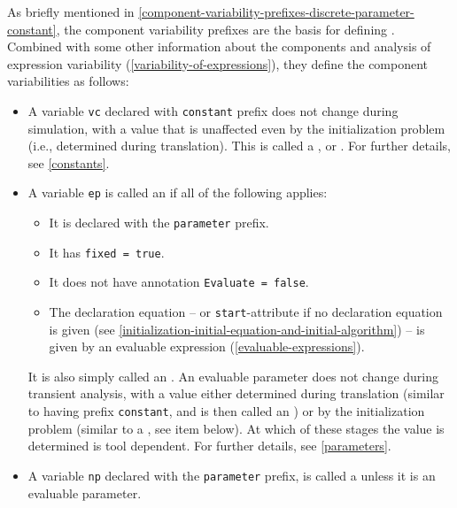 As briefly mentioned in \cref{component-variability-prefixes-discrete-parameter-constant}, the component variability prefixes are the basis for defining .
Combined with some other information about the components and analysis of expression variability (\cref{variability-of-expressions}), they define the component variabilities as follows:
\begin{itemize}
\item
  A variable \lstinline!vc! declared with \lstinline!constant! prefix does not change during simulation, with a value that is unaffected even by the initialization problem (i.e., determined during translation).
  This is called a , or .
  For further details, see \ref{constants}.
\item
  A variable \lstinline!ep! is called an  if all of the following applies:
  \begin{itemize}
  \item
    It is declared with the \lstinline!parameter! prefix.
  \item
    It has \lstinline!fixed = true!.
  \item
    It does not have annotation \lstinline!Evaluate = false!.
  \item
    The declaration equation -- or \lstinline!start!-attribute if no declaration equation is given (see \cref{initialization-initial-equation-and-initial-algorithm}) -- is given by an evaluable expression (\cref{evaluable-expressions}).
  \end{itemize}
  It is also simply called an .
  An evaluable parameter does not change during transient analysis, with a value either determined during translation (similar to having prefix \lstinline!constant!, and is then called an ) or by the initialization problem (similar to a , see item below).
  At which of these stages the value is determined is tool dependent.
  For further details, see \ref{parameters}.
\item
  A variable \lstinline!np! declared with the \lstinline!parameter! prefix, is called a  unless it is an evaluable parameter.

\end{itemize}
